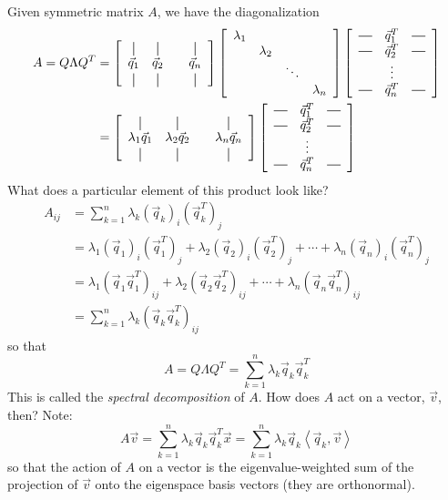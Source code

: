 Given symmetric matrix $A$, we have the diagonalization 
\begin{align*} 
A = Q\Lambda Q^T & = \left[ \begin{array}{cccc} \vertbar & \vertbar & & \vertbar \\ \vec{q}_1 & \vec{q}_2 & & \vec{q}_n \\ \vertbar & \vertbar & & \vertbar \end{array}\right] \left[ \begin{array}{cccc} \lambda_1 & & & \\ & \lambda_2 & & \\ & & \ddots & \\ & & & \lambda_n \end{array}\right] \left[ \begin{array}{ccc} \horzbar & \vec{q}_1^T & \horzbar \\ \horzbar & \vec{q}_2^T & \horzbar \\ & \vdots & \\ \horzbar & \vec{q}_n^T & \horzbar \end{array}\right] \\
& = \left[ \begin{array}{cccc} \vertbar & \vertbar & & \vertbar \\ \lambda_1\vec{q}_1 & \lambda_2\vec{q}_2 & & \lambda_n\vec{q}_n \\ \vertbar & \vertbar & & \vertbar \end{array}\right]  \left[ \begin{array}{ccc} \horzbar & \vec{q}_1^T & \horzbar \\ \horzbar & \vec{q}_2^T & \horzbar \\ & \vdots & \\ \horzbar & \vec{q}_n^T & \horzbar \end{array}\right]
\end{align*}
What does a particular element of this product look like?
\begin{align*}
A_{ij} & = \sum_{k=1}^n \lambda_k \left(\vec{q}_k\right)_i \left(\vec{q}^T_k\right)_j \\
& = \lambda_1 \left(\vec{q}_1\right)_i \left(\vec{q}^T_1\right)_j + \lambda_2 \left(\vec{q}_2\right)_i \left(\vec{q}^T_2\right)_j + \cdots + \lambda_n \left(\vec{q}_n\right)_i \left(\vec{q}^T_n\right)_j \\
& =  \lambda_1 \left(\vec{q}_1 \vec{q}^T_1\right)_{ij} + \lambda_2 \left(\vec{q}_2 \vec{q}_2^T\right)_{ij} + \cdots + \lambda_n \left(\vec{q}_n\vec{q}_n^T\right)_{ij} \\
& = \sum_{k=1}^n \lambda_k \left(\vec{q}_k \vec{q}^T_k \right)_{ij}
\end{align*}
so that \[ A = Q\Lambda Q^T = \sum_{k=1}^n \lambda_k \vec{q}_k \vec{q}^T_k \] This is called the \textit{spectral decomposition} of $A$. How does $A$ act on a vector, $\vec{v}$, then? Note: \[ A\vec{v} = \sum_{k=1}^n \lambda_k \vec{q}_k \vec{q}^T_k \vec{x} = \sum_{k=1}^n \lambda_k \vec{q}_k \left\langle \vec{q}_k, \vec{v}\right\rangle \] so that the action of $A$ on a vector is the eigenvalue-weighted sum of the projection of $\vec{v}$ onto the eigenspace basis vectors (they are orthonormal).



